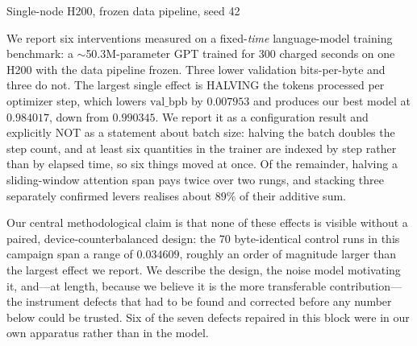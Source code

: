 \documentclass[10pt]{article}
\begin{document}

%
{Single-node H200, frozen data pipeline, seed 42}

\begin{icmlabstract}
We report six interventions measured on a fixed-\emph{time} language-model training
benchmark: a $\sim$50.3M-parameter GPT trained for 300 charged seconds on one H200 with
the data pipeline frozen. Three lower validation bits-per-byte and three do not. The
largest single effect is HALVING the tokens processed per optimizer step, which lowers
$\mathrm{val\_bpb}$ by $0.007953$ and produces our best model at $0.984017$, down from
$0.990345$. We report it as a configuration result and explicitly NOT as a statement about
batch size: halving the batch doubles the step count, and at least six quantities in the
trainer are indexed by step rather than by elapsed time, so six things moved at once. Of
the remainder, halving a sliding-window attention span pays twice over two rungs, and
stacking three separately confirmed levers realises about $89\%$ of their additive sum.

Our central methodological claim is that none of these effects is visible without a
paired, device-counterbalanced design: the 70 byte-identical control runs in this campaign
span a range of $0.034609$, roughly an order of magnitude larger than the largest effect
we report. We describe the design, the noise model motivating it, and---at length, because
we believe it is the more transferable contribution---the instrument defects that had to
be found and corrected before any number below could be trusted. Six of the seven defects
repaired in this block were in our own apparatus rather than in the model.
\end{icmlabstract}
\end{document}
